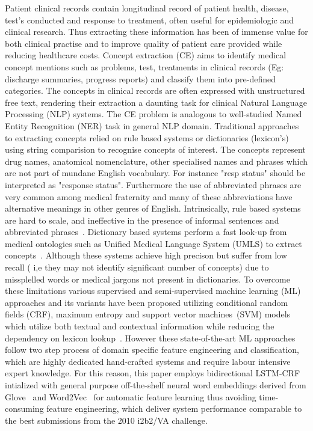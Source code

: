 \documentclass[11pt]{article}
\begin{document}
Patient clinical records contain  longitudinal record of patient health, disease, test's conducted  and response to treatment, often useful for epidemiologic and clinical research. Thus extracting these information  has been of immense value for both clinical practise and to improve  quality of patient care provided  while reducing healthcare costs. Concept extraction (CE) aims to identify medical concept mentions such as problems, test, treatments in  clinical  records (Eg: discharge summaries, progress reports) and classify them into pre-defined categories. The concepts in  clinical records are often expressed with unstructured free text, rendering their extraction a daunting task for  clinical Natural Language Processing (NLP) systems. The CE  problem is analogous to well-studied Named Entity Recognition (NER) task in general NLP domain. Traditional approaches to extracting concepts relied on  rule based systems or dictionaries (lexicon's) using string comparision to recognise concepts of interest. The concepts  represent drug names, anatomical nomenclature, other specialised names and phrases which are not part of mundane English vocabulary. For instance "resp status" should be interpreted as "response status". Furthermore the use of abbreviated phrases are very common among medical fraternity and many of these abbreviations have alternative meanings in other genres of English. Intrinsically, rule based systems are hard to scale, and ineffective in the presence of informal sentences and abbreviated phrases~\cite{liu2015drug}. Dictionary based systems perform a  fast look-up  from medical ontologies such as Unified Medical Language System (UMLS)  to extract concepts~\cite{kipper2008system}. Although these systems achieve high precison but suffer from low recall ( i,e they may not identify significant number of concepts) due to missplelled words or medical jargons not present in dictionaries. To overcome these limitations various supervised and semi-supervised machine learning (ML) approaches and its variants  have been proposed utilizing conditional random fields (CRF), maximum entropy and support vector machines~(SVM) models which utilize both textual and contextual information while reducing the dependency on lexicon lookup~\cite{lafferty2001conditional,berger1996maximum,joachims1998text}. However these state-of-the-art ML approaches follow two step process of domain specific feature engineering and classification, which are highly dedicated hand-crafted systems and require labour intensive expert knowledge. For this reason, this paper employs bidirectional LSTM-CRF intialized with  general purpose off-the-shelf neural word embeddings derived from Glove~\cite{Pennington:14} and Word2Vec~\cite{Mikolov:13}  for automatic feature learning thus avoiding time-consuming feature engineering,  which deliver system performance comparable to the best submissions from the 2010 i2b2/VA challenge. 
\end{document}

